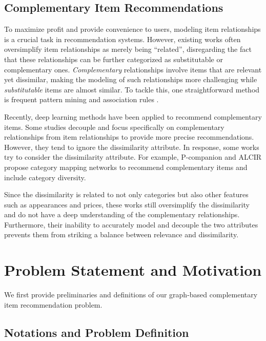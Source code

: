 \documentclass[letterpaper]{article} %
\begin{document}
\subsection{Complementary Item Recommendations}
To maximize profit and provide convenience to users,
modeling item relationships is a crucial task in recommendation systems. However, existing works \cite{wang2011utilizing, yao2018judging,MengWSLCLZ18} often oversimplify item relationships as merely being ``related'', disregarding the fact that these relationships can be further categorized as substitutable or complementary ones. \textit{Complementary} relationships involve items that are relevant yet dissimilar, making the modeling of such relationships more challenging while \textit{substitutable} items are almost similar. To tackle this, one straightforward method is frequent pattern mining and association rules \cite{han2007frequent}.


Recently, deep learning methods have been applied to recommend complementary items. Some studies \cite{mcauley2015inferring, wang2018path, cen2019representation, liu2020decoupled, wu2022towards, chen2023enhanced} decouple and focus specifically on complementary relationships from item relationships to provide more precise recommendations.
However, they tend to ignore the dissimilarity attribute. In response, some works try to consider the dissimilarity attribute. For example, P-companion \cite{hao2020p} and ALCIR \cite{bibas2023semi} propose category mapping networks to recommend complementary items and include category diversity.

Since the dissimilarity is related to not only categories but also other features such as appearances and prices, these works still oversimplify the dissimilarity and do not have a deep understanding of the complementary relationships. Furthermore, their inability to accurately model and decouple the two attributes prevents them from striking a balance between relevance and dissimilarity.



\section{Problem Statement and Motivation}
We first provide preliminaries and definitions of our graph-based complementary item recommendation problem.

\subsection{Notations and Problem Definition}
\label{sec:preliminaey_study}
\end{document}
